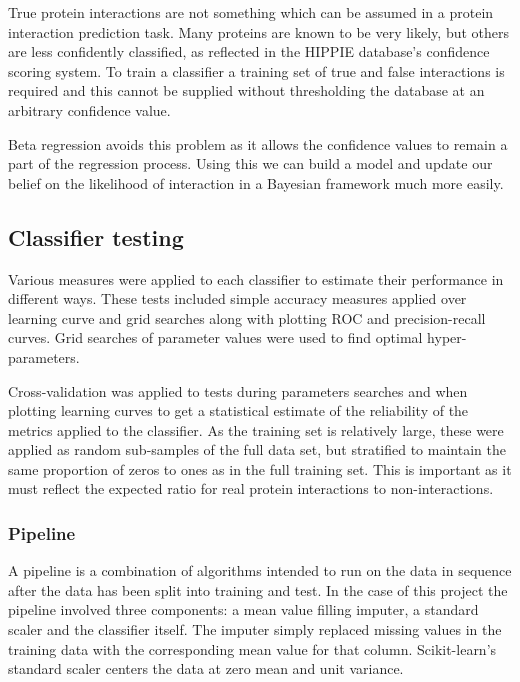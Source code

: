 True protein interactions are not something which can be assumed in a protein interaction prediction task.
Many proteins are known to be very likely, but others are less confidently classified, as reflected in the HIPPIE database's confidence scoring system\autocite{schaefer_hippie:_2012}.
To train a classifier a training set of true and false interactions is required and this cannot be supplied without thresholding the database at an arbitrary confidence value.

Beta regression avoids this problem as it allows the confidence values to remain a part of the regression process.
Using this we can build a model and update our belief on the likelihood of interaction in a Bayesian framework much more easily.

\subsection{Classifier testing}
\label{classifierverification}

%  

Various measures were applied to each classifier to estimate their performance in different ways.
These tests included simple accuracy measures applied over learning curve and grid searches along with plotting ROC and precision-recall curves.
Grid searches of parameter values were used to find optimal hyper-parameters.

Cross-validation was applied to tests during parameters searches and when plotting learning curves to get a statistical estimate of the reliability of the metrics applied to the classifier\autocite[152]{witten_data_2011}.
As the training set is relatively large, these were applied as random sub-samples of the full data set, but stratified to maintain the same proportion of zeros to ones as in the full training set.
This is important as it must reflect the expected ratio for real protein interactions to non-interactions.

\subsubsection*{Pipeline}

A pipeline is a combination of algorithms intended to run on the data in sequence after the data has been split into training and test.
In the case of this project the pipeline involved three components: a mean value filling imputer, a standard scaler and the classifier itself.
The imputer simply replaced missing values in the training data with the corresponding mean value for that column.
Scikit-learn's standard scaler centers the data at zero mean and unit variance.


